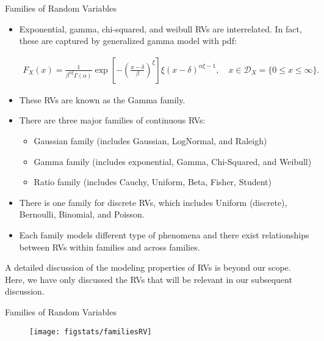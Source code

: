 \documentclass[handout,9pt]{beamer}
\begin{document}
%
\begin{frame}{Families of Random Variables}
\begin{itemize}
\setlength{\itemsep}{5pt}
\item Exponential, gamma, chi-squared, and weibull RVs are interrelated. In fact, these are captured by generalized gamma model with pdf:
\begin{block}{}
\begin{align*}
F_X(x)=\frac{1}{\beta^{\alpha\xi}\Gamma(\alpha)}\exp\left[-\left(\frac{x-\delta}{\beta}\right)^\xi\right]\xi(x-\delta)^{\alpha\xi-1},\quad x\in \mathcal{D}_X=\{0\leq x\leq \infty\}.
\end{align*}
\end{block}
\item These RVs are known as the Gamma family. 
\item There are three major families of continuous RVs: 
\begin{itemize}
\item Gaussian family (includes Gaussian, LogNormal, and Raleigh)
\item Gamma family (includes exponential, Gamma, Chi-Squared, and Weibull)
\item Ratio family (includes Cauchy, Uniform, Beta, Fisher, Student)
\end{itemize}

\item There is one family for discrete RVs, which includes Uniform (discrete), Bernoulli, Binomial, and Poisson.

\item Each family models different type of phenomena and there exist relationships between RVs within families and across families. 

\end{itemize}
A detailed discussion of the modeling properties of RVs is beyond our scope. Here, we have only discussed the RVs that will be relevant in our subsequent discussion. 

\end{frame}

%
\begin{frame}{Families of Random Variables}

\begin{figure}[!htb]
    \centering
	\texttt{[image: figstats/familiesRV]}
\end{figure}

\end{frame}
\end{document}
